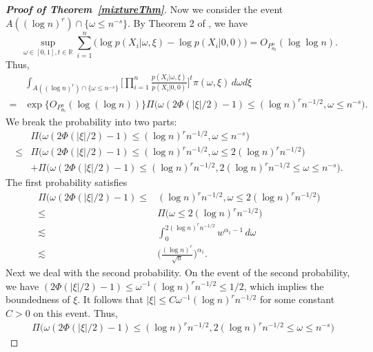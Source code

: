 \documentclass[11pt]{article}
\theoremstyle{plain}
\theoremstyle{definition}
\theoremstyle{remark}
\begin{document}
\begin{appendices}
\begin{proof}[\textbf{Proof of Theorem~\ref{mixtureThm}}]
Now we consider the event $A((\log n)^r)\cap \{\omega\leq n^{-s}\} $. By Theorem 2 of \cite{LIU200461}, we have 
\begin{equation*}
    \sup_{\omega\in [0,1],t\in \mathbb{R}}
    \sum_{i=1}^n \big(\log p(X_i|\omega,\xi)-\log p(X_i|0,0)\big)
    =O_{P^n_{\theta_0}}(\log \log n).
\end{equation*}
Thus,
\begin{align*}
    & \int_{A( (\log n)^r )\cap \{\omega\leq n^{-s}\}} \Big[\prod_{i=1}^n \frac{p(X_i|\omega,\xi)}{p(X_i|0,0)}\Big]^t \pi(\omega,\xi)\, d\omega d\xi
    \\
    =&\exp\big\{O_{P^n_{\theta_0}}(\log(\log n))\big\}
    \Pi\big(\omega(2\Phi(|\xi|/2)-1)\leq (\log n)^r n^{-1/2}, \omega\leq n^{-s}\big).
\end{align*}
We break the probability into two parts: 
\begin{align*}
    &\Pi\big(\omega(2\Phi(|\xi|/2)-1)\leq (\log n)^r n^{-1/2}, \omega\leq n^{-s}\big)
    \\
    \leq &
    \Pi\big(\omega(2\Phi(|\xi|/2)-1)\leq (\log n)^r n^{-1/2}, \omega\leq  2(\log n)^r n^{-1/2}\big)
    \\
    &
    +
    \Pi\big(\omega(2\Phi(|\xi|/2)-1)\leq (\log n)^r n^{-1/2},   2(\log n)^r n^{-1/2} \leq \omega\leq n^{-s}\big)
    .
\end{align*}
The first probability satisfies
\begin{align*}
    \Pi\big(\omega(2\Phi(|\xi|/2)-1)
    \leq & (\log n)^r n^{-1/2}, \omega\leq  2(\log n)^r n^{-1/2}\big)
    \\
    \leq &
    \Pi\big( \omega\leq  2(\log n)^r n^{-1/2}\big)
    \\
    \lesssim  &
    \int_{0}^{2(\log n)^r n^{-1/2}} w^{\alpha_1-1}\, d\omega
    \\
    \lesssim & \Big(\frac{(\log n)^r}{\sqrt{n}}\Big)^{\alpha_1}.
\end{align*}
Next we deal with the second probability.
On the event of the second probability, we have
$
    (2\Phi(|\xi|/2)-1)\leq \omega^{-1} (\log n)^r n^{-1/2}\leq 1/2
    $,
which implies the boundedness of $\xi$.
It follows that
$
|\xi|\leq C\omega^{-1} (\log n)^r n^{-1/2}
$
for some constant $C>0$ on this event.
Thus,
\begin{align*}
    &\Pi\big(\omega(2\Phi(|\xi|/2)-1)\leq (\log n)^r n^{-1/2},   2(\log n)^r n^{-1/2} \leq \omega\leq n^{-s}\big)

\end{align*}
\end{proof}
\end{appendices}
\end{document}
